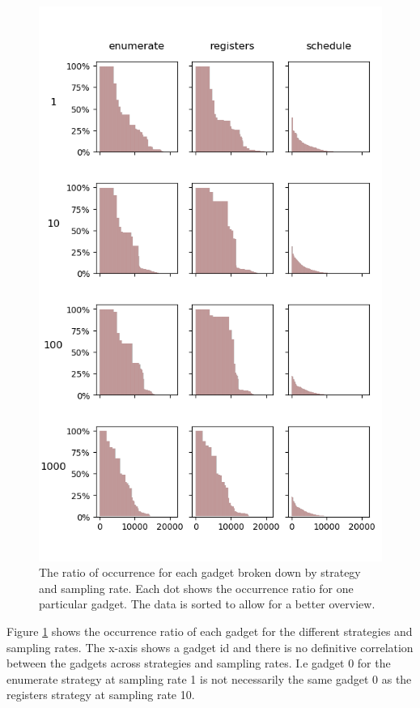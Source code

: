\begin{figure}[htp]
	\centering
	\includegraphics[width=\textwidth,height=\textheight]{results/figures/gadgets}
	\caption{The ratio of occurrence for each gadget broken down by strategy and sampling rate.
Each dot shows the occurrence ratio for one particular gadget. The data is sorted to allow
	for a better overview.}
	\label{fig:gadgets}
\end{figure}

Figure \ref{fig:gadgets} shows the occurrence ratio of each gadget for the different
strategies and sampling rates. The x-axis shows a gadget id and there is no definitive
correlation between the gadgets across strategies and sampling rates. I.e gadget 0 for the
enumerate strategy at sampling rate 1 is not necessarily the same gadget 0 as the registers
strategy at sampling rate 10.

